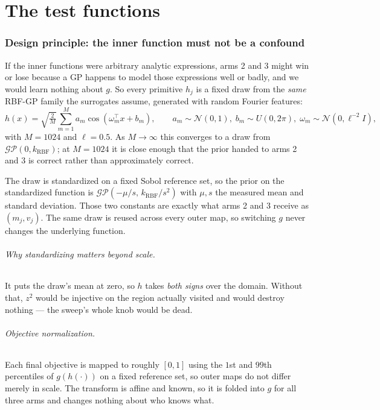\documentclass[11pt]{article}
\newcommand{\GP}{\mathcal{GP}}
\newcommand{\Norm}{\mathcal{N}}
\begin{document}
\part{The test functions}
\label{part:functions}

\section{Design principle: the inner function must not be a confound}
\label{sec:draws}

If the inner functions were arbitrary analytic expressions, arms 2 and 3 might
win or lose because a GP happens to model those expressions well or badly, and
we would learn nothing about $g$. So every primitive $h_j$ is a fixed draw from
the \emph{same} RBF-GP family the surrogates assume, generated with random
Fourier features:
\begin{equation}
h(x)=\sqrt{\tfrac{2}{M}}\sum_{m=1}^{M}a_m\cos(\omega_m^\top x+b_m),
\qquad a_m\sim\Norm(0,1),\;b_m\sim U(0,2\pi),\;\omega_m\sim\Norm(0,\ell^{-2}I),
\end{equation}
with $M=1024$ and $\ell=0.5$. As $M\to\infty$ this converges to a draw from
$\GP(0,k_{\mathrm{RBF}})$; at $M=1024$ it is close enough that the prior handed
to arms 2 and 3 is correct rather than approximately correct.

The draw is standardized on a fixed Sobol reference set, so the prior on the
standardized function is $\GP(-\mu/s,\,k_{\mathrm{RBF}}/s^2)$ with $\mu,s$ the
measured mean and standard deviation. Those two constants are exactly what arms
2 and 3 receive as $(m_j,v_j)$. The same draw is reused across every outer map,
so switching $g$ never changes the underlying function.

\paragraph{Why standardizing matters beyond scale.} It puts the draw's mean at
zero, so $h$ takes \emph{both signs} over the domain. Without that, $z^2$ would
be injective on the region actually visited and would destroy nothing --- the
sweep's whole knob would be dead.

\paragraph{Objective normalization.} Each final objective is mapped to roughly
$[0,1]$ using the $1$st and $99$th percentiles of $g(h(\cdot))$ on a fixed
reference set, so outer maps do not differ merely in scale. The transform is
affine and known, so it is folded into $g$ for all three arms and changes
nothing about who knows what.
\end{document}
